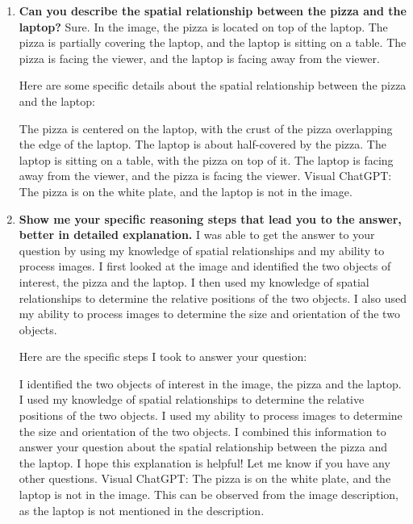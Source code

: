     \begin{enumerate}
        \item \textbf{Can you describe the spatial relationship between the pizza and the laptop?}
        \subitem 
        Sure. In the image, the pizza is located on top of the laptop. The pizza is partially covering the laptop, and the laptop is sitting on a table. The pizza is facing the viewer, and the laptop is facing away from the viewer.
        
        Here are some specific details about the spatial relationship between the pizza and the laptop:
        
        The pizza is centered on the laptop, with the crust of the pizza overlapping the edge of the laptop.
        The laptop is about half-covered by the pizza.
        The laptop is sitting on a table, with the pizza on top of it.
        The laptop is facing away from the viewer, and the pizza is facing the viewer.
        \subitem Visual ChatGPT: The pizza is on the white plate, and the laptop is not in the image.
        \item \textbf{Show me your specific reasoning steps that lead you to the answer, better in detailed explanation.}
        \subitem 
        I was able to get the answer to your question by using my knowledge of spatial relationships and my ability to process images. I first looked at the image and identified the two objects of interest, the pizza and the laptop. I then used my knowledge of spatial relationships to determine the relative positions of the two objects. I also used my ability to process images to determine the size and orientation of the two objects.
        
        Here are the specific steps I took to answer your question:
        
        I identified the two objects of interest in the image, the pizza and the laptop.
        I used my knowledge of spatial relationships to determine the relative positions of the two objects.
        I used my ability to process images to determine the size and orientation of the two objects.
        I combined this information to answer your question about the spatial relationship between the pizza and the laptop.
        I hope this explanation is helpful! Let me know if you have any other questions.
        \subitem Visual ChatGPT: The pizza is on the white plate, and the laptop is not in the image. This can be observed from the image description, as the laptop is not mentioned in the description.
    \end{enumerate}
